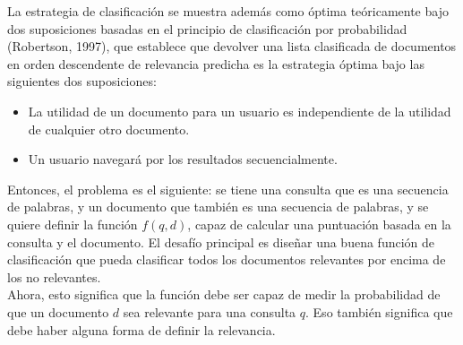 La estrategia de clasificación se muestra además como óptima teóricamente bajo dos suposiciones basadas en el principio de clasificación por probabilidad (Robertson, 1997), que establece que devolver una lista clasificada de documentos en orden descendente de relevancia predicha es la estrategia óptima bajo las siguientes dos suposiciones:
\begin{itemize}
\item La utilidad de un documento para un usuario es independiente de la utilidad de cualquier otro documento.
\item Un usuario navegará por los resultados secuencialmente.
\end{itemize}

Entonces, el problema es el siguiente: se tiene una consulta que es una secuencia de palabras, y un documento que también es una secuencia de palabras, y se quiere definir la función $f(q, d)$, capaz de calcular una puntuación basada en la consulta y el documento. El desafío principal es diseñar una buena función de clasificación que pueda clasificar todos los documentos relevantes por encima de los no relevantes. \\

Ahora, esto significa que la función debe ser capaz de medir la probabilidad de que un documento $d$ sea relevante para una consulta $q$. Eso también significa que debe haber alguna forma de definir la relevancia.